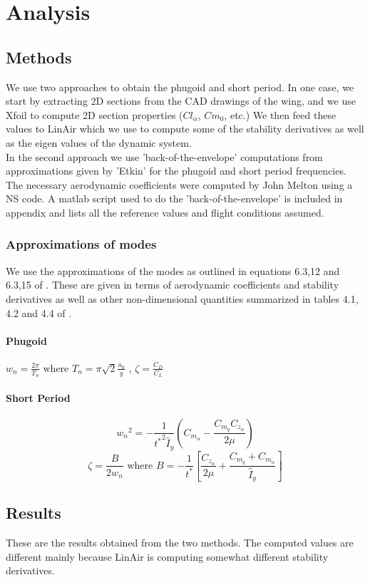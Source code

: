 \documentclass[titlepage,10pt]{article}
\begin{document}
\section{Analysis}
\subsection{Methods}
We use two approaches to obtain the phugoid and short period. In one case, we start by extracting 2D sections from the CAD drawings of the wing, and we use Xfoil to compute 2D section properties ($Cl_\alpha$, $Cm_0$, etc.) We then feed these values to LinAir which we use to compute some of the stability derivatives as well as the eigen values of the dynamic system.\\

In the second approach we use 'back-of-the-envelope' computations from approximations given by 'Etkin' \cite{Etkin} for the phugoid and short period frequencies. The necessary aerodynamic coefficients were computed by John Melton using a NS code. A matlab script used to do the 'back-of-the-envelope' is included in appendix and lists all the reference values and flight conditions assumed.
\subsubsection{Approximations of modes}
We use the approximations of the modes as outlined in equations 6.3,12 and 6.3,15 of \cite{Etkin}. These are given in terms of aerodynamic coefficients and stability derivatives as well as other non-dimensional quantities summarized in tables 4.1, 4.2 and 4.4 of \cite{Etkin}.
\paragraph{Phugoid} $ {w_n} = \frac{2\pi}{T_n} \mbox{ where } T_n = \pi\sqrt{2}\frac{u_0}{g} $ , $ \zeta =  \frac{C_D}{C_L} $

\paragraph{Short Period}
$$ {w_n}^2 = - \frac{1}{{t^*}^2 \hat{I}_y} (C_{m_\alpha} - \frac{C_{m_q} C_{z_\alpha}}{2 \mu} ) $$
$$ \zeta =  \frac{B}{2 w_n} \mbox{ where } B = -\frac{1}{t^*} \left[	
 								\frac{C_{z_\alpha}}{2 \mu} + 
 								\frac{C_{m_q} + C_{m_{\dot{\alpha}}} }{\hat{I}_y}
 								 \right] $$
 								 
 								 
\subsection{Results}
These are the results obtained from the two methods. The computed values are different mainly because LinAir is computing somewhat different stability derivatives.\\
\end{document}
